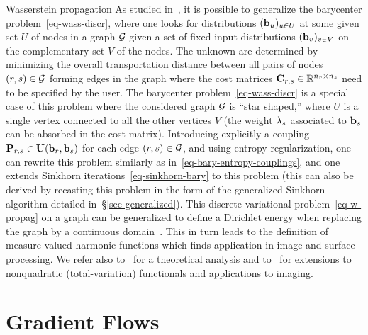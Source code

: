 \begin{rem1}{Wasserstein propagation}
	As studied in~\citet{Solomon-ICML}, it is possible to generalize the barycenter problem~\eqref{eq-wass-discr}, where one looks for distributions $(\mathrm{\textbf{b}}_u)_{u \in U}$ at some given set $U$ of nodes in a graph $\mathcal{G}$ given a set of fixed input distributions $(\mathrm{\textbf{b}}_v)_{v \in V}$ on the complementary set $V$ of the nodes. The unknown are determined by minimizing the overall transportation distance between all pairs of nodes $(r,s) \in \mathcal{G}$ forming edges in the graph
	where the cost matrices $\mathrm{\textbf{C}}_{r,s} \in \mathbb{R}^{n_r \times n_s}$ need to be specified by the user.
	The barycenter problem~\eqref{eq-wass-discr} is a special case of this problem where the considered graph $\mathcal{G}$ is ``star shaped,'' where $U$ is a single vertex connected to all the other vertices $V$ (the weight $\lambda_s$ associated to $\mathrm{\textbf{b}}_s$ can be absorbed in the cost matrix). 
	Introducing explicitly a coupling $\mathrm{\textbf{P}}_{r,s} \in \mathrm{\textbf{U}}( \mathrm{\textbf{b}}_r,\mathrm{\textbf{b}}_s )$ for each edge $(r,s) \in \mathcal{G}$, and using entropy regularization, one can rewrite this problem similarly as in~\eqref{eq-bary-entropy-couplings}, and one extends Sinkhorn iterations~\eqref{eq-sinkhorn-bary} to this problem (this can also be derived by recasting this problem in the form of the generalized Sinkhorn algorithm detailed in~\S\ref{sec-generalized}). 
	This discrete variational problem~\eqref{eq-w-propag} on a graph can be generalized to define a Dirichlet energy when replacing the graph by a continuous domain~\citep{solomon2013dirichlet}. This in turn leads to the definition of measure-valued harmonic functions which finds application in image and surface  processing. We refer also to~\citet{Lavenant2017} for a theoretical analysis and to~\citet{vogt2017measure} for extensions to nonquadratic (total-variation) functionals and applications to imaging.
\end{rem1}



\section{Gradient Flows}
\label{sec-grad-flows}


